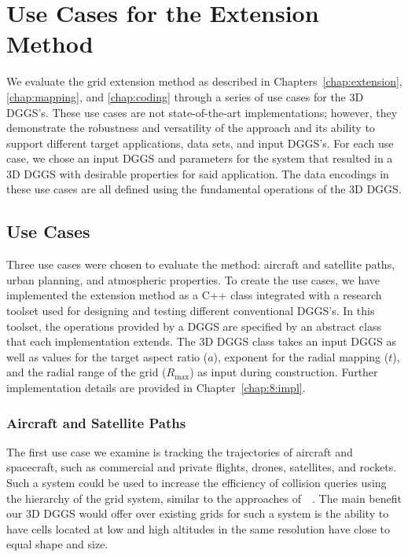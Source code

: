 \chapter{Use Cases for the Extension Method} \label{chap:usecases}
We evaluate the grid extension method as described in Chapters~\ref{chap:extension}, \ref{chap:mapping}, and \ref{chap:coding} through a series of use cases for the 3D DGGS's.
These use cases are not state-of-the-art implementations; however, they demonstrate the robustness and versatility of the approach and its ability to support different target applications, data sets, and input DGGS's.
For each use case, we chose an input DGGS and parameters for the system that resulted in a 3D DGGS with desirable properties for said application.
The data encodings in these use cases are all defined using the fundamental operations of the 3D DGGS.


\section{Use Cases}
Three use cases were chosen to evaluate the method: aircraft and satellite paths, urban planning, and atmospheric properties.
To create the use cases, we have implemented the extension method as a C++ class integrated with a research toolset used for designing and testing different conventional DGGS's.
In this toolset, the operations provided by a DGGS are specified by an abstract class that each implementation extends.
The 3D DGGS class takes an input DGGS as well as values for the target aspect ratio ($a$), exponent for the radial mapping ($t$), and the radial range of the grid ($R_\mathrm{max}$) as input during construction.
Further implementation details are provided in Chapter~\ref{chap:8:impl}.


\subsection{Aircraft and Satellite Paths}
The first use case we examine is tracking the trajectories of aircraft and spacecraft, such as commercial and private flights, drones, satellites, and rockets.
Such a system could be used to increase the efficiency of collision queries using the hierarchy of the grid system, similar to the approaches of~~\cite{miao2019low, zhai2019collision}.
The main benefit our 3D DGGS would offer over existing grids for such a system is the ability to have cells located at low and high altitudes in the same resolution have close to equal shape and size.


